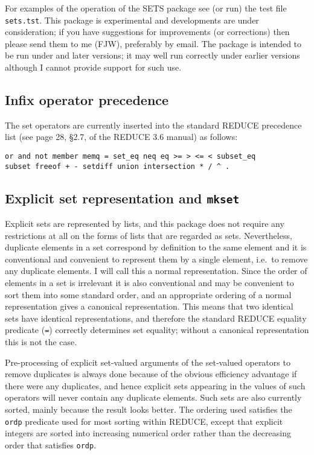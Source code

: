 For examples of the operation of the SETS package see (or run) the
test file {\tt sets.tst}.  This package is experimental and
developments are under consideration; if you have suggestions for
improvements (or corrections) then please send them to me (FJW),
preferably by email.  The package is intended to be run under
 and later versions; it may well run correctly under earlier
versions although I cannot provide support for such use.


\subsection{Infix operator precedence}

The set operators are currently inserted into the standard REDUCE
precedence list (see page 28, \S2.7, of the REDUCE 3.6 manual) as
follows:
\begin{verbatim}
or and not member memq = set_eq neq eq >= > <= < subset_eq
subset freeof + - setdiff union intersection * / ^ .
\end{verbatim}


\subsection{Explicit set representation and {\tt mkset}}

Explicit sets are represented by lists, and this package does not
require any restrictions at all on the forms of lists that are
regarded as sets.  Nevertheless, duplicate elements in a set
correspond by definition to the same element and it is conventional
and convenient to represent them by a single element, i.e.\ to remove
any duplicate elements.  I will call this a normal representation.
Since the order of elements in a set is irrelevant it is also
conventional and may be convenient to sort them into some standard
order, and an appropriate ordering of a normal representation gives a
canonical representation.  This means that two identical sets have
identical representations, and therefore the standard REDUCE equality
predicate ({\tt =}) correctly determines set equality; without a
canonical representation this is not the case.

Pre-processing of explicit set-valued arguments of the set-valued
operators to remove duplicates is always done because of the obvious
efficiency advantage if there were any duplicates, and hence explicit
sets appearing in the values of such operators will never contain any
duplicate elements.  Such sets are also currently sorted, mainly
because the result looks better.  The ordering used satisfies the {\tt
ordp} predicate used for most sorting within REDUCE, except that
explicit integers are sorted into increasing numerical order rather
than the decreasing order that satisfies {\tt ordp}.


